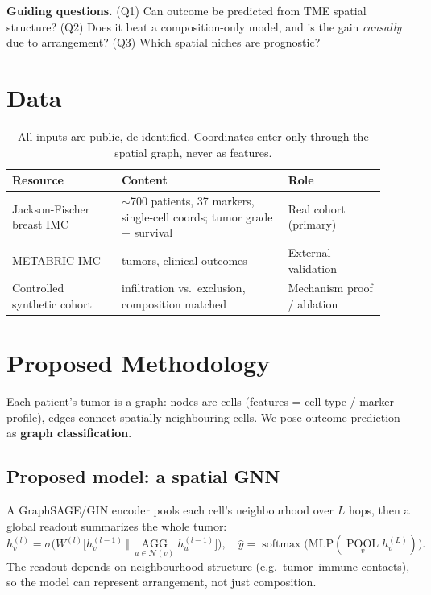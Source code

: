 \documentclass[11pt]{article}
\newcommand{\NN}{\mathcal{N}}
\begin{document}
\noindent\textbf{Guiding questions.} (Q1) Can outcome be predicted from TME
spatial structure? (Q2) Does it beat a composition-only model, and is the gain
\emph{causally} due to arrangement? (Q3) Which spatial niches are prognostic?

\section{Data}

\begin{table}[h]
\centering\small
\begin{tabular}{>{\raggedright\arraybackslash}p{0.27\linewidth} >{\raggedright\arraybackslash}p{0.41\linewidth} >{\raggedright\arraybackslash}p{0.24\linewidth}}
\toprule
\rowcolor{sriblue}\color{white}\textbf{Resource} & \color{white}\textbf{Content} & \color{white}\textbf{Role}\\
\midrule
\rowcolor{srirow} Jackson-Fischer breast IMC & $\sim$700 patients, 37 markers, single-cell coords; tumor grade + survival & Real cohort (primary)\\
METABRIC IMC & 483 tumors, clinical outcomes & External validation\\
\rowcolor{srirow} Controlled synthetic cohort & infiltration vs.\ exclusion, composition matched & Mechanism proof / ablation\\
\bottomrule
\end{tabular}
\caption{All inputs are public, de-identified. Coordinates enter only through
the spatial graph, never as features.}
\label{tab:data}
\end{table}

\section{Proposed Methodology}

Each patient's tumor is a graph: nodes are cells (features = cell-type / marker
profile), edges connect spatially neighbouring cells. We pose outcome prediction
as \textbf{graph classification}.

\subsection{Proposed model: a spatial GNN}
A GraphSAGE/GIN encoder pools each cell's neighbourhood over $L$ hops, then a
global readout summarizes the whole tumor:
\begin{equation}
h_v^{(l)} = \sigma\!\Big(W^{(l)}\big[h_v^{(l-1)}\,\big\Vert\,
\textstyle\operatorname*{AGG}_{u\in\NN(v)} h_u^{(l-1)}\big]\Big), \quad
\hat{y} = \operatorname{softmax}\!\big(\mathrm{MLP}(\textstyle\operatorname*{POOL}_v h_v^{(L)})\big).
\label{eq:gnn}
\end{equation}
The readout depends on neighbourhood structure (e.g.\ tumor--immune contacts),
so the model can represent arrangement, not just composition.
\end{document}
